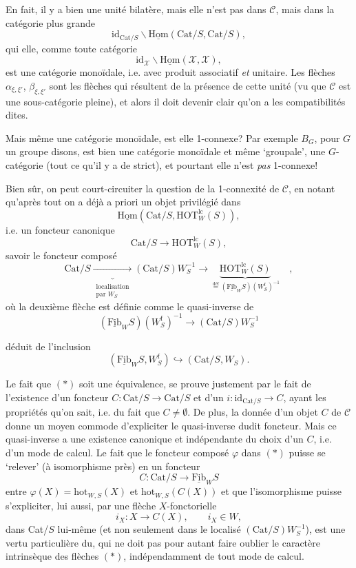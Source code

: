 \documentclass[11pt]{article}
\newcommand{\printedpage}[1]{\marginpar{\footnotesize p.~#1}}
\newcommand{\msp}[1]{\marginpar{\footnotesize [#1]}}
\newcommand{\Fib}{\underline{\mathrm{Fib}}}
\newcommand{\Hom}{\underline{\mathrm{Hom}}}
\newcommand{\Cat}{\mathrm{Cat}}
\newcommand{\HOT}{\mathrm{HOT}}
\newcommand{\hot}{\mathrm{hot}}
\newcommand{\id}{\mathrm{id}}
\begin{document}
En fait, il y a bien une unité bilatère, mais elle n'est pas dans $\mathcal{C}$, mais dans la catégorie plus grande
\[
\id_{\Cat/S}\backslash\Hom(\Cat/S, \Cat/S),
\]
qui elle, comme toute catégorie
\[
\id_{\mathcal{X}}\backslash\Hom(\mathcal{X}, \mathcal{X}),
\]
\printedpage{133}
est une catégorie monoïdale, i.e. avec produit associatif \textit{et} unitaire. Les flèches $\alpha_{\xi,\xi'}$, $\beta_{\xi,\xi'}$ sont les flèches qui résultent de la présence de cette unité (vu que $\mathcal{C}$ est une sous-catégorie pleine), et alors il doit devenir clair qu'on a les compatibilités dites.

\msp{page 204}Mais même une catégorie monoïdale, est elle 1-connexe? Par exemple $B_G$, pour $G$ un groupe disons, est bien une catégorie monoïdale et même ‘groupale’, une $G$-catégorie (tout ce qu'il y a de strict), et pourtant elle n'est \textit{pas} 1-connexe!

Bien sûr, on peut court-circuiter la question de la 1-connexité de $\mathcal{C}$, en notant qu'après tout on a déjà a priori un objet privilégié dans
\[
\Hom(\Cat/S, \HOT^{\mathrm{lc}}_W(S)),
\]
i.e. un foncteur canonique
\[
\Cat/S \longrightarrow \HOT^{\mathrm{lc}}_W(S),
\]
savoir le foncteur composé
\[
\Cat/S \underbrace{\longrightarrow}_{\substack{\text{localisation}\\ \text{par } W_S}} (\Cat/S)W_S^{-1} \longrightarrow \underbrace{\HOT^{\mathrm{lc}}_W(S)}_{\overset{\text{déf}}{=} (\Fib_W S)(W^{\mathrm{f}}_S)^{-1}} \quad ,
\tag*{$(*)$}
\]
où la deuxième flèche est définie comme le quasi-inverse de
\[
(\Fib_W S)(W^{\mathrm{f}}_S)^{-1} \longrightarrow (\Cat/S)W_S^{-1}
\tag*{$(**)$}
\]

\msp{page 205}déduit de l'inclusion
\[
(\Fib_W S, W^{\mathrm{f}}_S) \hookrightarrow (\Cat/S, W_S).
\]

Le fait que $(*)$ soit une équivalence, se prouve justement par le fait de l'existence d'un foncteur $C : \Cat/S \longrightarrow \Cat/S$ et d'un $i : \id_{\Cat/S} \longrightarrow C$, ayant les propriétés qu'on sait, i.e. du fait que $C \neq \emptyset$. De plus, la donnée d'un objet $C$ de $\mathcal{C}$ donne un moyen commode d'expliciter le quasi-inverse dudit foncteur. Mais ce quasi-inverse a une existence canonique et indépendante du choix d'un $C$, i.e. d'un mode de calcul. Le fait que le foncteur composé $\varphi$ dans $(*)$ puisse se ‘relever’ (à isomorphisme près) en un foncteur %
\[
C : \Cat/S \longrightarrow \Fib_W S
\]
entre $\varphi(X) = \hot_{W,S}(X)$ et $\hot_{W,S}(C(X))$ et que l'isomorphisme puisse s'expliciter, lui aussi, par une flèche $X$-fonctorielle
\[
i_X : X \longrightarrow C(X), \qquad i_X \in W,
\]
dans Cat/$S$ lui-même (et non seulement dans le localisé $(\Cat/S)W_S^{-1}$),
\printedpage{134}
\msp{page 206}est une vertu particulière du, qui ne doit pas pour autant faire oublier le caractère intrinsèque des flèches $(*)$, indépendamment de tout mode de calcul.
\end{document}

